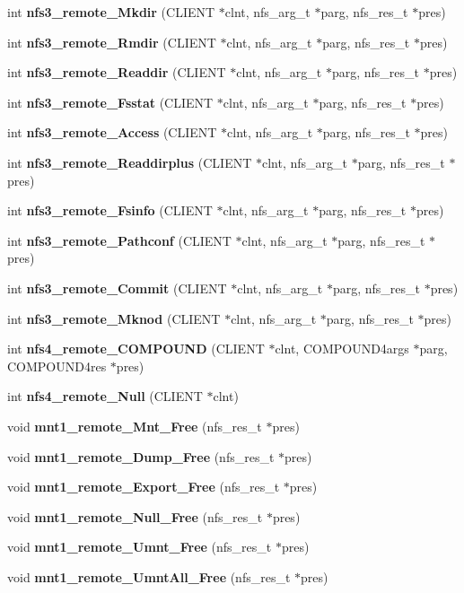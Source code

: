 \begin{CompactItemize}
\item 
int {\bf nfs3\_\-remote\_\-Mkdir} (CLIENT $\ast$clnt, nfs\_\-arg\_\-t $\ast$parg, nfs\_\-res\_\-t $\ast$pres)
\item 
int {\bf nfs3\_\-remote\_\-Rmdir} (CLIENT $\ast$clnt, nfs\_\-arg\_\-t $\ast$parg, nfs\_\-res\_\-t $\ast$pres)
\item 
int {\bf nfs3\_\-remote\_\-Readdir} (CLIENT $\ast$clnt, nfs\_\-arg\_\-t $\ast$parg, nfs\_\-res\_\-t $\ast$pres)
\item 
int {\bf nfs3\_\-remote\_\-Fsstat} (CLIENT $\ast$clnt, nfs\_\-arg\_\-t $\ast$parg, nfs\_\-res\_\-t $\ast$pres)
\item 
int {\bf nfs3\_\-remote\_\-Access} (CLIENT $\ast$clnt, nfs\_\-arg\_\-t $\ast$parg, nfs\_\-res\_\-t $\ast$pres)
\item 
int {\bf nfs3\_\-remote\_\-Readdirplus} (CLIENT $\ast$clnt, nfs\_\-arg\_\-t $\ast$parg, nfs\_\-res\_\-t $\ast$pres)
\item 
int {\bf nfs3\_\-remote\_\-Fsinfo} (CLIENT $\ast$clnt, nfs\_\-arg\_\-t $\ast$parg, nfs\_\-res\_\-t $\ast$pres)
\item 
int {\bf nfs3\_\-remote\_\-Pathconf} (CLIENT $\ast$clnt, nfs\_\-arg\_\-t $\ast$parg, nfs\_\-res\_\-t $\ast$pres)
\item 
int {\bf nfs3\_\-remote\_\-Commit} (CLIENT $\ast$clnt, nfs\_\-arg\_\-t $\ast$parg, nfs\_\-res\_\-t $\ast$pres)
\item 
int {\bf nfs3\_\-remote\_\-Mknod} (CLIENT $\ast$clnt, nfs\_\-arg\_\-t $\ast$parg, nfs\_\-res\_\-t $\ast$pres)
\item 
int {\bf nfs4\_\-remote\_\-COMPOUND} (CLIENT $\ast$clnt, COMPOUND4args $\ast$parg, COMPOUND4res $\ast$pres)
\item 
int {\bf nfs4\_\-remote\_\-Null} (CLIENT $\ast$clnt)
\item 
void {\bf mnt1\_\-remote\_\-Mnt\_\-Free} (nfs\_\-res\_\-t $\ast$pres)
\item 
void {\bf mnt1\_\-remote\_\-Dump\_\-Free} (nfs\_\-res\_\-t $\ast$pres)
\item 
void {\bf mnt1\_\-remote\_\-Export\_\-Free} (nfs\_\-res\_\-t $\ast$pres)
\item 
void {\bf mnt1\_\-remote\_\-Null\_\-Free} (nfs\_\-res\_\-t $\ast$pres)
\item 
void {\bf mnt1\_\-remote\_\-Umnt\_\-Free} (nfs\_\-res\_\-t $\ast$pres)
\item 
void {\bf mnt1\_\-remote\_\-Umnt\-All\_\-Free} (nfs\_\-res\_\-t $\ast$pres)
\item 

\end{CompactItemize}
